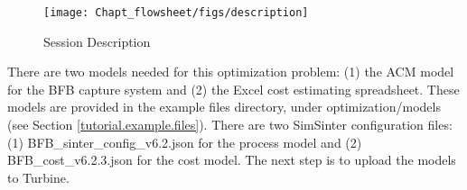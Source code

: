 \begin{figure}[H]
	\begin{center}
		\texttt{[image: Chapt\_flowsheet/figs/description]}
		\caption{Session Description}
		\label{fig.tut.opt.description}
	\end{center}
\end{figure}

\label{subsec.opt.tutorial.flowsheet}
There are two models needed for this optimization problem: (1) the ACM model for the BFB capture system and (2) the Excel cost estimating spreadsheet. These models are provided in the example files directory, under optimization/models (see Section \ref{tutorial.example.files}). There are two SimSinter configuration files: (1) BFB\_sinter\_config\_v6.2.json for the process model and (2) BFB\_cost\_v6.2.3.json for the cost model. The next step is to upload the models to Turbine.

